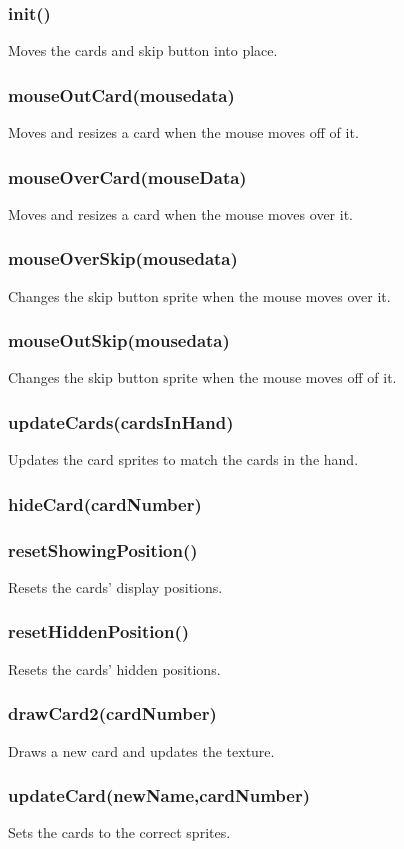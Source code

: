 \documentclass[12pt]{article}
\begin{document}
\subsubsection*{init()}
Moves the cards and skip button into place. 
\subsubsection*{mouseOutCard(mousedata)}
Moves and resizes a card when the mouse moves off of it. 
\subsubsection*{mouseOverCard(mouseData)}
Moves and resizes a card when the mouse moves over it. 
\subsubsection*{mouseOverSkip(mousedata)}
Changes the skip button sprite when the mouse moves over it. 
\subsubsection*{mouseOutSkip(mousedata)}
Changes the skip button sprite when the mouse moves off of it. 
\subsubsection*{updateCards(cardsInHand)}
Updates the card sprites to match the cards in the hand. 
\subsubsection*{hideCard(cardNumber)}
\subsubsection*{resetShowingPosition()}
Resets the cards' display positions.
\subsubsection*{resetHiddenPosition()}
Resets the cards' hidden positions.  
\subsubsection*{drawCard2(cardNumber)}
Draws a new card and updates the texture.
\subsubsection*{updateCard(newName,cardNumber)}
Sets the cards to the correct sprites. 
\end{document}
